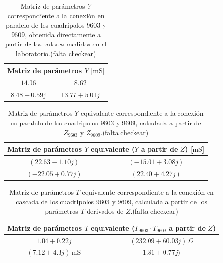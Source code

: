 \begin{table}[H]
\centering
\begin{tabular}{|c|c|}
\hline
\multicolumn{2}{|c|}{\textbf{Matriz de parámetros $Y$  [$\mathrm{mS}$]}} \\ \hline
$14.06\, $ & $8.62\, $ \\ \hline
$8.48 - 0.59j\, $ & $13.77 + 5.01 j\,$ \\ \hline
\end{tabular}
\caption{Matriz de parámetros $Y$ correspondiente a la conexión en paralelo de los cuadripolos 9603 y 9609, obtenida directamente a partir de los valores medidos en el laboratorio.(falta checkear)}
\label{tab:matriz_Y_paralelo_directa}
\end{table}

\begin{table}[H]
\centering
\begin{tabular}{|c|c|}
\hline
\multicolumn{2}{|c|}{\textbf{Matriz de parámetros $Y$ equivalente ($Y$ a partir de $Z$) [$\mathrm{mS}$]}} \\ \hline
$(22.53 - 1.10j)\,$ & $(-15.01 + 3.08j)\,$ \\ \hline
$(-22.05 + 0.77j)\,$ & $(22.40 + 4.27j)\,$ \\ \hline
\end{tabular}
\caption{Matriz de parámetros $Y$ equivalente correspondiente a la conexión en paralelo de los cuadripolos 9603 y 9609, calculada a partir de $Z_{9603}$ y $Z_{9609}$.(falta checkear)}
\label{tab:matriz_Y_paralelo_desdeZ}
\end{table}

\begin{table}[H]
\centering
\begin{tabular}{|c|c|}
\hline
\multicolumn{2}{|c|}{\textbf{Matriz de parámetros $T$ equivalente ($T_{9603} \cdot T_{9609}$ a partir de $Z$)}} \\ \hline
$1.04 + 0.22j$ & $(232.09 + 60.03j)\,\Omega$ \\ \hline
$(7.12 + 4.3 j)\,\mathrm{mS}$ & $1.81 + 0.77

j)$ \\ \hline
\end{tabular}
\caption{Matriz de parámetros $T$ equivalente correspondiente a la conexión en cascada de los cuadripolos 9603 y 9609, calculada a partir de los parámetros $T$ derivados de $Z$.(falta checkear)}
\label{tab:matriz_T_cascada_desdeZ}
\end{table}
